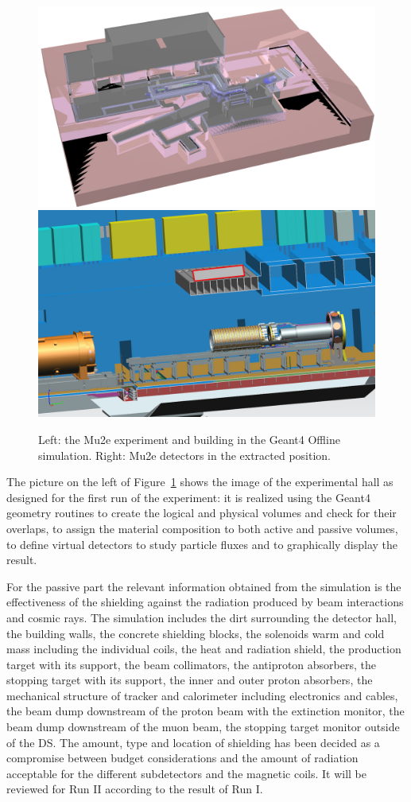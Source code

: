 \begin{figure}[htb]
\begin{center}
\includegraphics[height=0.29\linewidth]{figures/mu2eHall.png}
\includegraphics[height=0.29\linewidth]{figures/geom_extracted.png}
\caption{Left: the Mu2e experiment and building in the Geant4 Offline simulation. Right: Mu2e detectors in the extracted position.}
\label{fig:mu2e_geom}
\end{center}
\end{figure}

The picture on the left of Figure~\ref{fig:mu2e_geom} shows the image of the experimental hall as designed for the first run of the experiment: it is realized using the Geant4 geometry routines to create the logical and physical volumes and check for their overlaps, to assign the material composition to both active and passive volumes, to define virtual detectors to study particle fluxes and to graphically display the result.

For the passive part the relevant information obtained from the simulation is the effectiveness of the shielding against the radiation produced by beam interactions and cosmic rays. The simulation includes the dirt surrounding the detector hall, the building walls, the concrete shielding blocks, the solenoids warm and cold mass including the individual coils, the heat and radiation shield, the  production target with its support, the beam collimators, the antiproton absorbers, the stopping target with its support, the inner and outer proton absorbers, the mechanical structure of tracker and calorimeter including electronics and cables, the beam dump downstream of the proton beam with the extinction monitor, the beam dump downstream of the muon beam, the stopping target monitor outside of the DS.
The amount, type and location of shielding has been decided as a compromise between budget considerations and the amount of radiation acceptable for the different subdetectors and the magnetic coils. It will be reviewed for Run II according to the result of Run I.
 
